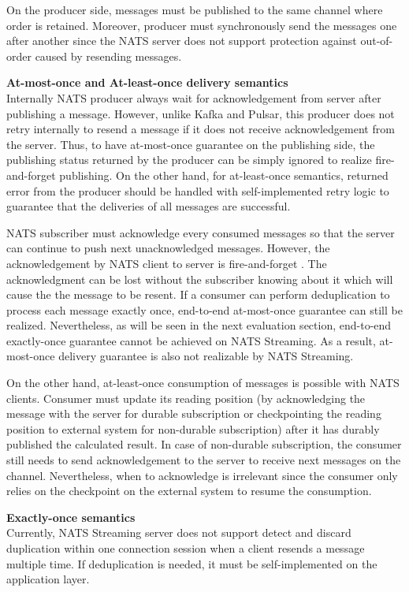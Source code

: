 On the producer side, messages must be published to the same channel where order is retained. Moreover, producer must synchronously send the messages one after another since the NATS server does not support protection against out-of-order caused by resending messages.  

\textbf{At-most-once and At-least-once delivery semantics}\\
Internally NATS producer always wait for acknowledgement from server after publishing a message. However, unlike Kafka and Pulsar, this producer does not retry internally to resend a message if it does not receive acknowledgement from the server. Thus, to have at-most-once guarantee on the publishing side, the publishing status returned by the producer can be simply ignored to realize fire-and-forget publishing. On the other hand, for at-least-once semantics, returned error from the producer should be handled with self-implemented retry logic to guarantee that the deliveries of all messages are successful.

NATS subscriber must acknowledge every consumed messages so that the server can continue to push next unacknowledged messages. However, the acknowledgement by NATS client to server is fire-and-forget \cite{natsorder}. The acknowledgment can be lost without the subscriber knowing about it which will cause the the message to be resent. If a consumer can perform deduplication to process each message exactly once, end-to-end at-most-once guarantee can still be realized. Nevertheless, as will be seen in the next evaluation section, end-to-end exactly-once guarantee cannot be achieved on NATS Streaming. As a result, at-most-once delivery guarantee is also not realizable by NATS Streaming.

On the other hand, at-least-once consumption of messages is possible with NATS clients. Consumer must update its reading position (by acknowledging the message with the server for durable subscription or checkpointing the reading position to external system for non-durable subscription) after it has durably published the calculated result. In case of non-durable subscription, the consumer still needs to send acknowledgement to the server to receive next messages on the channel. Nevertheless, when to acknowledge is irrelevant since the consumer only relies on the checkpoint on the external system to resume the consumption. 

\textbf{Exactly-once semantics}\\
Currently, NATS Streaming server does not support detect and discard duplication within one connection session when a client resends a message multiple time. If deduplication is needed, it must be self-implemented on the application layer. 

